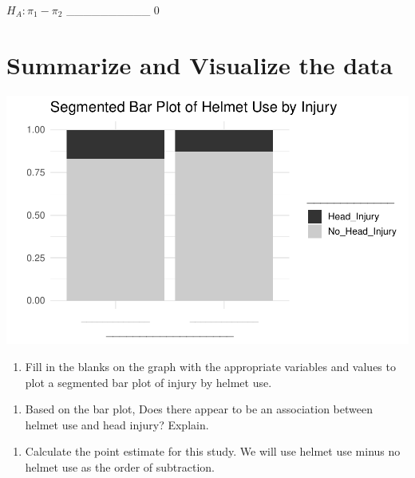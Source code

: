 \documentclass[
]{report}
\providecommand{\tightlist}{%
  \setlength{\itemsep}{0pt}\setlength{\parskip}{0pt}}
\begin{document}
\(H_A: \pi_1 -\pi_2\) \_\_\_\_\_\_\_\_\_\_ 0

\hypertarget{summarize-and-visualize-the-data-1}{%
\section{Summarize and Visualize the data}\label{summarize-and-visualize-the-data-1}}

\begin{center}\includegraphics[width=0.7\linewidth]{07-inference-2cat_files/figure-latex/unnamed-chunk-2-1} \end{center}

\begin{enumerate}
\def\labelenumi{\arabic{enumi}.}
\setcounter{enumi}{11}
\tightlist
\item
  Fill in the blanks on the graph with the appropriate variables and values to plot a segmented bar plot of injury by helmet use.
\end{enumerate}

\vspace{1in}

\begin{enumerate}
\def\labelenumi{\arabic{enumi}.}
\setcounter{enumi}{12}
\tightlist
\item
  Based on the bar plot, Does there appear to be an association between helmet use and head injury? Explain.
\end{enumerate}

\vspace{1in}

\begin{enumerate}
\def\labelenumi{\arabic{enumi}.}
\setcounter{enumi}{13}
\tightlist
\item
  Calculate the point estimate for this study. We will use helmet use minus no helmet use as the order of subtraction.
\end{enumerate}

\vspace{1in}
\end{document}
